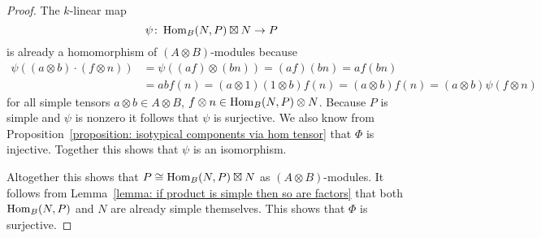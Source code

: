 \begin{proof}
  The $k$-linear map
  \[
            \psi
    \colon  \operatorname{Hom}_B(N,P) \boxtimes N
    \to     P
  \]
  is already a homomorphism of $(A \otimes B)$-modules because
  \begin{align*}
        \psi((a \otimes b) \cdot (f \otimes n))
    &=  \psi((af) \otimes (bn))
     =  (af)(bn)
     =  a f(bn) \\
    &=  a b f(n)
     =  (a \otimes 1)(1 \otimes b) f(n)
     =  (a \otimes b) f(n)
     =  (a \otimes b) \psi(f \otimes n)
  \end{align*}
  for all simple tensors $a \otimes b \in A \otimes B$, $f \otimes n \in \operatorname{Hom}_B(N,P) \otimes N$.
  Because $P$ is simple and $\psi$ is nonzero it follows that $\psi$ is surjective.
  We also know from Proposition~\ref{proposition: isotypical components via hom tensor} that $\Phi$ is injective.
  Together this shows that $\psi$ is an isomorphism.
  
  Altogether this shows that $P \cong \operatorname{Hom}_B(N,P) \boxtimes N$ as $(A \otimes B)$-modules.
  It follows from Lemma~\ref{lemma: if product is simple then so are factors} that both $\operatorname{Hom}_B(N,P)$ and $N$ are already simple themselves.
  This shows that $\Phi$ is surjective.
\end{proof}




